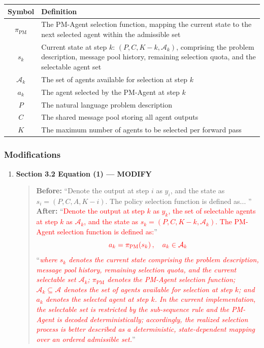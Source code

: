 \documentclass[11pt,a4paper]{article}
\begin{document}
\begin{center}
\begin{tabular}{cp{10cm}}
\toprule
\textbf{Symbol} & \textbf{Definition} \\
\midrule
$\pi_{\mathrm{PM}}$ & The PM-Agent selection function, mapping the current state to the next selected agent within the admissible set \\
\midrule
$s_k$ & Current state at step $k$: $(P, C, K-k, \mathcal{A}_k)$, comprising the problem description, message pool history, remaining selection quota, and the selectable agent set \\
\midrule
$\mathcal{A}_k$ & The set of agents available for selection at step $k$ \\
\midrule
$a_k$ & The agent selected by the PM-Agent at step $k$ \\
\midrule
$P$ & The natural language problem description \\
\midrule
$C$ & The shared message pool storing all agent outputs \\
\midrule
$K$ & The maximum number of agents to be selected per forward pass \\
\bottomrule
\end{tabular}
\end{center}

\subsubsection{Modifications}
\begin{enumerate}
\item \textbf{Section 3.2 Equation (1) --- MODIFY}
\begin{quote}
\textbf{Before:} ``Denote the output at step $i$ as $y_i$, and the state as $s_i = (P, C, A, K-i)$. The policy selection function is defined as... ''\\[4pt]
\textbf{After:} ``\textcolor{red}{Denote the output at step $k$ as $y_k$, the set of selectable agents at step $k$ as $\mathcal{A}_k$, and the state as $s_k=(P, C, K-k, \mathcal{A}_k)$. The PM-Agent selection function is defined as:}''
\begin{equation}
\textcolor{red}{a_k = \pi_{\mathrm{PM}}\!\left(s_k\right), \quad a_k \in \mathcal{A}_k}
\end{equation}
``\textit{\textcolor{red}{where $s_k$ denotes the current state comprising the problem description, message pool history, remaining selection quota, and the current selectable set $\mathcal{A}_k$; $\pi_{\mathrm{PM}}$ denotes the PM-Agent selection function; $\mathcal{A}_k \subseteq \mathcal{A}$ denotes the set of agents available for selection at step $k$; and $a_k$ denotes the selected agent at step $k$. In the current implementation, the selectable set is restricted by the sub-sequence rule and the PM-Agent is decoded deterministically; accordingly, the realized selection process is better described as a deterministic, state-dependent mapping over an ordered admissible set.}}''
\end{quote}
\end{enumerate}
\end{document}
